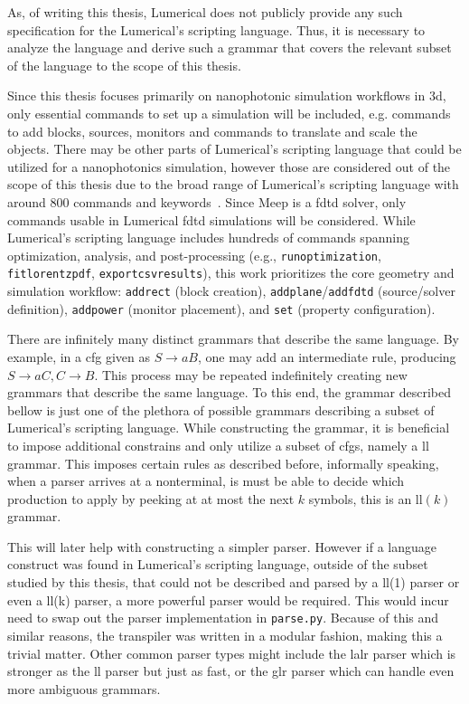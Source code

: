 As, of writing this thesis, Lumerical does not publicly provide any such specification for the Lumerical's scripting language. Thus, it is necessary to analyze the language and derive such a grammar that covers the relevant subset of the language to the scope of this thesis.

Since this thesis focuses primarily on nanophotonic simulation workflows in \gls{3d}, only essential commands to set up a simulation will be included, e.g. commands to add blocks, sources, monitors and commands to translate and scale the objects. There may be other parts of Lumerical's scripting language that could be utilized for a nanophotonics simulation, however those are considered out of the scope of this thesis due to the broad range of Lumerical's scripting language with around 800 commands and keywords~\cite{ansys_lsf_commands}. Since Meep is a \gls{fdtd} solver, only commands usable in Lumerical \gls{fdtd} simulations will be considered.
While Lumerical’s scripting language includes hundreds of commands spanning optimization, analysis, and post-processing (e.g., \texttt{runoptimization}, \texttt{fitlorentzpdf}, \texttt{exportcsvresults}), this work prioritizes the core geometry and simulation workflow: \texttt{addrect} (block creation), \texttt{addplane}/\texttt{addfdtd} (source/solver definition), \texttt{addpower} (monitor placement), and \texttt{set} (property configuration). 


There are infinitely many distinct grammars that describe the same language. By example, in a \gls{cfg} given as $S \rightarrow aB$, one may add an intermediate rule, producing $S \rightarrow aC, C \rightarrow B$. This process may be repeated indefinitely creating new grammars that describe the same language. To this end, the grammar described bellow is just one of the plethora of possible grammars describing a subset of Lumerical's scripting language. While constructing the grammar, it is beneficial to impose additional constrains and only utilize a subset of \glspl{cfg}, namely a \gls{ll} grammar. This imposes certain rules as described before, informally speaking, when a parser arrives at a nonterminal, is must be able to decide which production to apply by peeking at at most the next $k$ symbols, this is an \gls{ll}$(k)$ grammar.

This will later help with constructing a simpler parser. However if a language construct was found in Lumerical's scripting language, outside of the subset studied by this thesis, that could not be described and parsed by a \gls{ll}(1) parser or even a \gls{ll}(k) parser, a more powerful parser would be required. This would incur need to swap out the parser implementation in \texttt{parse.py}. Because of this and similar reasons, the transpiler was written in a modular fashion, making this a trivial matter. Other common parser types might include the \gls{lalr} parser which is stronger as the \gls{ll} parser but just as fast, or the \gls{glr} parser which can handle even more ambiguous grammars.


